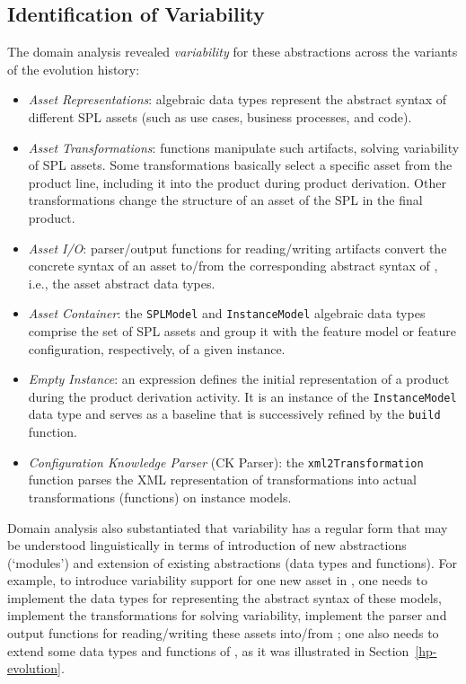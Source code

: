
\subsection{Identification of Variability} 
\label{sec:variability}

The domain analysis revealed \emph{variability} for these abstractions across the variants of the evolution history:

\begin{itemize}

\item \emph{Asset Representations}: algebraic data types represent the abstract syntax of different SPL assets (such as use cases, business processes, and code).

\item \emph{Asset Transformations}: functions manipulate such artifacts, solving variability of SPL assets. Some transformations basically select a specific asset from the product line, including it into the product during product derivation. Other transformations change the structure of an asset of the SPL in the final product.

\item \emph{Asset I/O}: parser/output functions for reading/writing artifacts convert the concrete syntax of an asset to/from the corresponding abstract syntax of \hpl{}, i.e., the asset abstract data types.

\item \emph{Asset Container}: the \texttt{SPLModel} and \texttt{InstanceModel} algebraic data types comprise the set of SPL assets and group it with the feature model or feature configuration, respectively, of a given \hpl{} instance.

\item \emph{Empty Instance}: an expression defines the initial representation of a product during the product derivation activity. It is an instance of the \texttt{InstanceModel} data type and serves as a baseline that is successively refined by the \texttt{build} function.

\item \emph{Configuration Knowledge Parser} (CK Parser): the \texttt{xml2Transformation} function parses the XML representation of transformations into actual transformations (functions) on instance models.

\end{itemize}

Domain analysis also substantiated that variability has a regular form that may be understood linguistically in terms of introduction of new abstractions (`modules') and extension of existing abstractions (data types and functions). For example, to introduce variability support for one new asset in \hp, one needs to implement the data types for representing the abstract syntax of these models, implement the transformations for solving variability, implement the parser and output functions for reading/writing these assets into/from \hp; one also needs to extend some data types and functions of \hp{}, as it was illustrated in Section~\ref{hp-evolution}.
